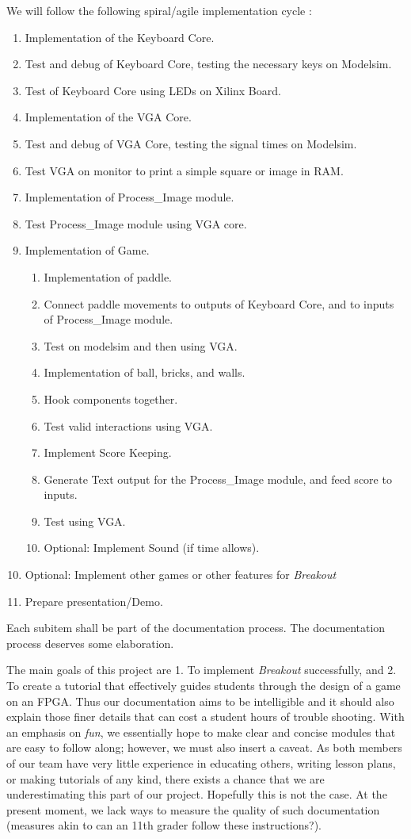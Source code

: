 \documentclass[conference]{IEEEtran}
\begin{document}
We will follow the following spiral/agile implementation cycle :
\begin{enumerate}
\item Implementation of the Keyboard Core.
\item Test and debug of Keyboard Core, testing the necessary keys on Modelsim.
\item Test of Keyboard Core using LEDs on Xilinx Board.
\item Implementation of the VGA Core.
\item Test and debug of VGA Core, testing the signal times on Modelsim.
\item Test VGA on monitor to print a simple square or image in RAM.
\item Implementation of Process\_Image module.
\item Test Process\_Image module using VGA core.
\item Implementation of Game.
\begin{enumerate}
\item Implementation of paddle.
\item Connect paddle movements to outputs of Keyboard Core, and to inputs of Process\_Image module.
\item Test on modelsim and then using VGA.
\item Implementation of ball, bricks, and walls.
\item Hook components together.
\item Test valid interactions using VGA.
\item Implement Score Keeping.
\item Generate Text output for the Process\_Image module, and feed score to inputs.
\item Test using VGA.
\item Optional: Implement Sound (if time allows).
\end{enumerate}
\item Optional: Implement other games or other features for \emph{Breakout}
\item Prepare presentation/Demo.
\end{enumerate}

Each subitem shall be part of the documentation process. The documentation process deserves some elaboration. 

The main goals of this project are 1. To implement \emph{Breakout} successfully, and 2. To create a tutorial that effectively guides students through the design of a game on an FPGA. Thus our documentation aims to be intelligible and it should also explain those finer details that can cost a student hours of trouble shooting. With an emphasis on \emph{fun}, we essentially hope to make clear and concise modules that are easy to follow along; however, we must also insert a caveat. As both members of our team have very little experience in educating others, writing lesson plans, or making tutorials of any kind, there exists a chance that we are underestimating this part of our project. Hopefully this is not the case. At the present moment, we lack ways to measure the quality of such documentation (measures akin to can an 11th grader follow these instructions?).
\end{document}
